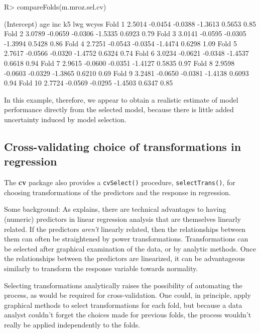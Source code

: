 \documentclass[
]{jss}
\begin{document}
\begin{CodeChunk}
\begin{CodeInput}
R> compareFolds(m.mroz.sel.cv)
\end{CodeInput}
\begin{CodeOutput}
        (Intercept)     age     inc      k5     lwg wcyes
Fold 1       2.5014 -0.0454 -0.0388 -1.3613  0.5653  0.85
Fold 2       3.0789 -0.0659 -0.0306 -1.5335  0.6923  0.79
Fold 3       3.0141 -0.0595 -0.0305 -1.3994  0.5428  0.86
Fold 4       2.7251 -0.0543 -0.0354 -1.4474  0.6298  1.09
Fold 5       2.7617 -0.0566 -0.0320 -1.4752  0.6324  0.74
Fold 6       3.0234 -0.0621 -0.0348 -1.4537  0.6618  0.94
Fold 7       2.9615 -0.0600 -0.0351 -1.4127  0.5835  0.97
Fold 8       2.9598 -0.0603 -0.0329 -1.3865  0.6210  0.69
Fold 9       3.2481 -0.0650 -0.0381 -1.4138  0.6093  0.94
Fold 10      2.7724 -0.0569 -0.0295 -1.4503  0.6347  0.85
\end{CodeOutput}
\end{CodeChunk}

In this example, therefore, we appear to obtain a realistic estimate of
model performance directly from the selected model, because there is
little added uncertainty induced by model selection.

\hypertarget{cross-validating-choice-of-transformations-in-regression}{%
\subsection{Cross-validating choice of transformations in
regression}\label{cross-validating-choice-of-transformations-in-regression}}

The \textbf{cv} package also provides a \texttt{cvSelect()} procedure,
\texttt{selectTrans()}, for choosing transformations of the predictors
and the response in regression.

Some background: As \citet[Sec. 8.2]{Weisberg:2014} explains, there are
technical advantages to having (numeric) predictors in linear regression
analysis that are themselves linearly related. If the predictors
\emph{aren't} linearly related, then the relationships between them can
often be straightened by power transformations. Transformations can be
selected after graphical examination of the data, or by analytic
methods. Once the relationships between the predictors are linearized,
it can be advantageous similarly to transform the response variable
towards normality.

Selecting transformations analytically raises the possibility of
automating the process, as would be required for cross-validation. One
could, in principle, apply graphical methods to select transformations
for each fold, but because a data analyst couldn't forget the choices
made for previous folds, the process wouldn't really be applied
independently to the folds.
\end{document}
